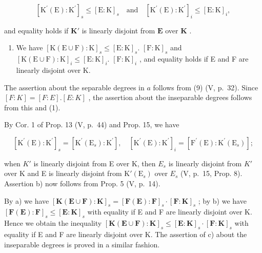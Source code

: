 \[
\left[ \mathrm{K} ^ {\prime} (\mathrm{E}): \mathrm{K} ^ {\prime} \right] _ {s} \leqslant \left[ \mathrm{E}: \mathrm{K} \right] _ {s} \quad \text{and} \quad \left[ \mathrm{K} ^ {\prime} (\mathrm{E}): \mathrm{K} ^ {\prime} \right] _ {i} \leqslant \left[ \mathrm{E}: \mathrm{K} \right] _ {i},
\]

and equality holds if \(\mathbf{K}'\) is linearly disjoint from \(\mathbf{E}\) over \(\mathbf{K}\) .

\begin{enumerate}
\def\labelenumi{\alph{enumi})}
\setcounter{enumi}{2}
\tightlist
\item
  We have \([\mathrm{K}(\mathrm{E}\cup \mathrm{F}):\mathrm{K}]_s\leqslant [\mathrm{E}:\mathrm{K}]_s.\) \([\mathrm{F}:\mathrm{K}]_s\) and \([\mathrm{K}(\mathrm{E}\cup \mathrm{F}):\mathrm{K}]_i\leqslant [\mathrm{E}:\mathrm{K}]_i.\) \([\mathrm{F}:\mathrm{K}]_i\) , and equality holds if E and F are linearly disjoint over K.
\end{enumerate}

The assertion about the separable degrees in \(a\) follows from (9) (V, p.~32). Since \([F:K] = [F:E].[E:K]\) , the assertion about the inseparable degrees follows from this and (1).

By Cor. 1 of Prop. 13 (V, p.~44) and Prop. 15, we have

\[
\left[ \mathrm{K} ^ {\prime} (\mathrm{E}): \mathrm{K} ^ {\prime} \right] _ {s} = \left[ \mathrm{K} ^ {\prime} \left(\mathrm{E} _ {s}\right): \mathrm{K} ^ {\prime} \right], \quad \left[ \mathrm{K} ^ {\prime} (\mathrm{E}): \mathrm{K} ^ {\prime} \right] _ {i} = \left[ \mathrm{F} ^ {\prime} (\mathrm{E}): \mathrm{K} ^ {\prime} \left(\mathrm{E} _ {s}\right) \right];\tag{2}
\]

when \(K'\) is linearly disjoint from E over K, then \(E_{s}\) is linearly disjoint from \(K'\) over K and E is linearly disjoint from \(\mathrm{K}'(\mathrm{E}_{s})\) over \(E_{s}\) (V, p.~15, Prop. 8). Assertion b) now follows from Prop. 5 (V, p.~14).

By a) we have \([\mathbf{K}(\mathbf{E}\cup\mathbf{F}):\mathbf{K}]_{s}=[\mathbf{F}(\mathbf{E}):\mathbf{F}]_{s}\cdot[\mathbf{F}:\mathbf{K}]_{s}\) ; by b) we have \([\mathbf{F}(\mathbf{E}):\mathbf{F}]_{s}\leqslant[\mathbf{E}:\mathbf{K}]_{s}\) with equality if E and F are linearly disjoint over K. Hence we obtain the inequality \([\mathbf{K}(\mathbf{E}\cup\mathbf{F}):\mathbf{K}]_{s}\leqslant[\mathbf{E}:\mathbf{K}]_{s}\cdot[\mathbf{F}:\mathbf{K}]_{s}\) with equality if E and F are linearly disjoint over K. The assertion of c) about the inseparable degrees is proved in a similar fashion.

